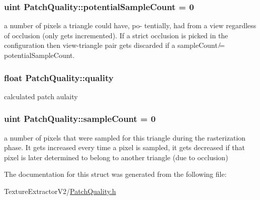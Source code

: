 \subsubsection[{potential\+Sample\+Count}]{\setlength{\rightskip}{0pt plus 5cm}uint Patch\+Quality\+::potential\+Sample\+Count = 0}\label{struct_patch_quality_adf9ac6ee8def50e84e0e68c4a9078fc2}
a number of pixels a triangle could have, po-\/ tentially, had from a view regardless of occlusion (only gets incremented). If a strict occlusion is picked in the configuration then view-\/triangle pair gets discarded if a sample\+Count ̸= potential\+Sample\+Count. \hypertarget{struct_patch_quality_abfe27ea5bb26348daaad5445958aff92}{}
\subsubsection[{quality}]{\setlength{\rightskip}{0pt plus 5cm}float Patch\+Quality\+::quality}\label{struct_patch_quality_abfe27ea5bb26348daaad5445958aff92}
calculated patch aulaity \hypertarget{struct_patch_quality_a3c8d512ff345ceef200c3f7c71e7ac38}{}
\subsubsection[{sample\+Count}]{\setlength{\rightskip}{0pt plus 5cm}uint Patch\+Quality\+::sample\+Count = 0}\label{struct_patch_quality_a3c8d512ff345ceef200c3f7c71e7ac38}
a number of pixels that were sampled for this triangle during the rasterization phase. It gets increased every time a pixel is sampled, it gets decreased if that pixel is later determined to belong to another triangle (due to occlusion) 

The documentation for this struct was generated from the following file\+:\begin{DoxyCompactItemize}
\item 
Texture\+Extractor\+V2/\hyperlink{_patch_quality_8h}{Patch\+Quality.\+h}\end{DoxyCompactItemize}
